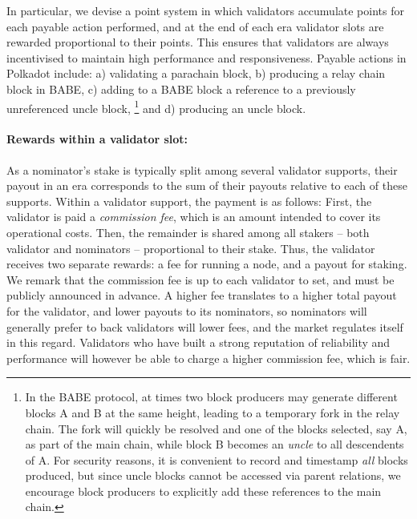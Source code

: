 \documentclass{article}
\begin{document}
In particular, we devise a point system in which validators accumulate points for each payable action performed, 
and at the end of each era validator slots are rewarded proportional to their points. 
This ensures that validators are always incentivised to maintain high performance and responsiveness. 
Payable actions in Polkadot include: a) validating a parachain block, 
b) producing a relay chain block in BABE, 
c) adding to a BABE block a reference to a previously unreferenced uncle block,%
\footnote{In the BABE protocol, at times two block producers may generate different blocks A and B at the same height, leading to a temporary fork in the relay chain. The fork will quickly be resolved and one of the blocks selected, say A, as part of the main chain, while block B becomes an \emph{uncle} to all descendents of A. For security reasons, it is convenient to record and timestamp \emph{all} blocks produced, but since uncle blocks cannot be accessed via parent relations, we encourage block producers to explicitly add these references to the main chain.}
and d) producing an uncle block.

\paragraph{Rewards within a validator slot:} As a nominator's stake is typically split among several validator supports, 
their payout in an era corresponds to the sum of their payouts relative to each of these supports. 
Within a validator support, the payment is as follows: 
First, the validator is paid a \emph{commission fee}, which is an amount intended to cover its operational costs. 
Then, the remainder is shared among all stakers -- both validator and nominators -- proportional to their stake. 
Thus, the validator receives two separate rewards: a fee for running a node, and a payout for staking. 
We remark that the commission fee is up to each validator to set, and must be publicly announced in advance. 
A higher fee translates to a higher total payout for the validator, and lower payouts to its nominators, 
so nominators will generally prefer to back validators will lower fees, and the market regulates itself in this regard. 
Validators who have built a strong reputation of reliability and performance 
will however be able to charge a higher commission fee, which is fair.

\medskip
\end{document}
